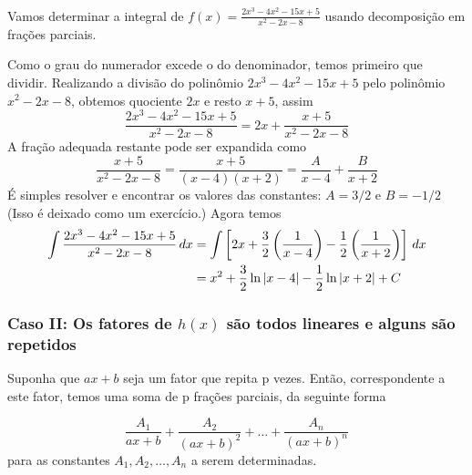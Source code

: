 \cleardoublepage\documentclass[../main.tex]{subfiles}
\begin{document}
\begin{ex}~\label{FracParcGrauNumeradorMaior}
\\ Vamos determinar a integral de $f(x)=\frac{2x^3-4x^2-15x+5}{x^2-2x-8}$ usando decomposição em frações parciais.
\begin{sol}
Como o grau do numerador excede o do denominador, temos primeiro que dividir. Realizando a divisão do polinômio $2x^3-4x^2-15x+5$ pelo polinômio $x^2-2x-8$, obtemos quociente $2x$ e resto $x+5$, assim
\begin{equation*}
\frac{2x^3-4x^2-15x+5}{x^2-2x-8}=2x+\frac{x+5}{x^2-2x-8}
\end{equation*}A fração adequada restante pode ser expandida como
\begin{equation*}
\frac{x+5}{x^2-2x-8}=\frac{x+5}{(x-4)(x+2)}=\frac{A}{x-4}+\frac{B}{x+2}
\end{equation*}
É simples resolver e encontrar os valores das constantes: $A = 3/2$ e $B = -1/2$ (Isso é deixado como um exercício.) Agora temos
\begin{align*}
\int \frac{2x^3-4x^2-15x+5}{x^2-2x-8}\, dx&=\int \left[2x+\frac{3}{2}\left(\frac{1}{x-4}\right)-\frac{1}{2}\left(\frac{1}{x+2}\right)\right]\, dx\\
& =x^2+\frac{3}{2}\ln |x-4|-\frac{1}{2}\ln |x+2|+C
\end{align*}
\end{sol}
\end{ex}

\subsubsection*{\hypertarget{FracParcCasoII}{}Caso II: Os fatores de $h(x)$ são todos lineares e alguns são repetidos}
Suponha que $a x + b$ seja um fator que repita p vezes. Então,
correspondente a este fator, temos uma soma de p frações parciais, da
seguinte forma


\begin{equation}
\frac{A_1}{ax+b}+\frac{A_2}{(ax+b)^2}+\ldots +\frac{A_n}{(ax+b)^n}
\end{equation}
para as constantes $A_1, A_2, \ldots, A_n$ a serem determinadas.
\end{document}
